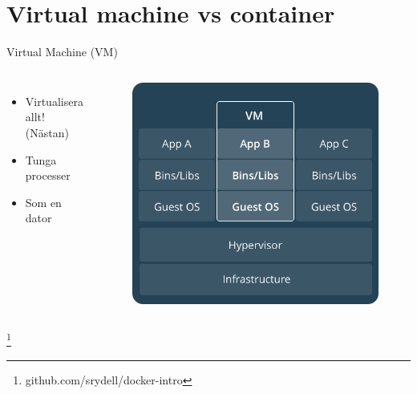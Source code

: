 \documentclass[12pt]{beamer}
\newcommand\blfootnote[1]{%
  \begingroup
  \renewcommand\thefootnote{}\footnote{#1}%
  \addtocounter{footnote}{-1}%
  \endgroup
}
\begin{document}
\section{Virtual machine vs container}

\begin{frame}{Virtual Machine (VM)}
    \begin{columns}
        \column{.25in}
        \column{2in}
        \begin{itemize}
            \item Virtualisera allt! (Nästan)
            \item Tunga processer
            \item Som en dator
        \end{itemize}
        \column{2.5in}
            \begin{figure}[h!]
                \centering
                \includegraphics[width=.8\textwidth]{../figures/vm.png}
            \end{figure}
    \end{columns}
    \blfootnote{github.com/srydell/docker-intro}
\end{frame}
\end{document}
